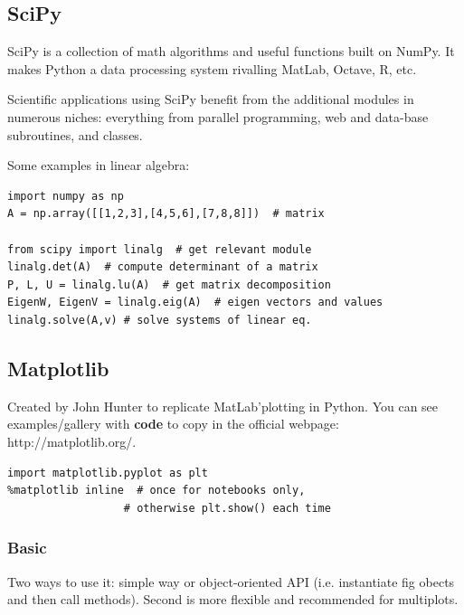 \documentclass[11pt]{article}
\begin{document}
\subsection{SciPy}
SciPy is a collection of math algorithms and useful functions built on NumPy. It makes Python a data processing system rivalling MatLab, Octave, R, etc.

Scientific applications using SciPy benefit from the additional modules in numerous niches: everything from parallel programming, web and data-base subroutines, and classes.

Some examples in linear algebra:
\begin{lstlisting}
import numpy as np
A = np.array([[1,2,3],[4,5,6],[7,8,8]])  # matrix

from scipy import linalg  # get relevant module
linalg.det(A)  # compute determinant of a matrix
P, L, U = linalg.lu(A)  # get matrix decomposition
EigenW, EigenV = linalg.eig(A)  # eigen vectors and values
linalg.solve(A,v) # solve systems of linear eq.
\end{lstlisting}


\subsection{Matplotlib}
Created by John Hunter to replicate MatLab'plotting in Python. You can see examples/gallery with \textbf{code} to copy in the official webpage: http://matplotlib.org/.
\begin{lstlisting}
import matplotlib.pyplot as plt
%matplotlib inline  # once for notebooks only, 
                  # otherwise plt.show() each time
\end{lstlisting}

\subsubsection{Basic}
Two ways to use it: simple way or object-oriented API (i.e. instantiate fig obects and then call methods). Second is more flexible and recommended for multiplots.
\end{document}
